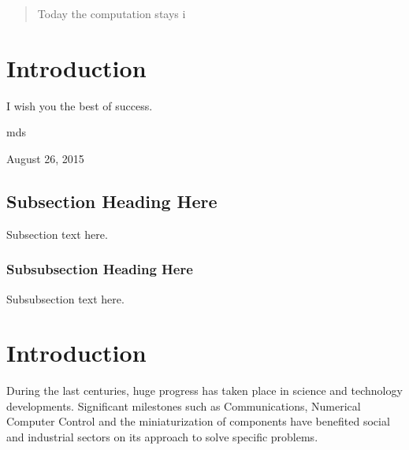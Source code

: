 \documentclass[conference]{IEEEtran}
\begin{document}




\maketitle

\begin{abstract}
Today the computation stays i 
\end{abstract}





%
\IEEEpeerreviewmaketitle



\section{Introduction}

I wish you the best of success.

\hfill mds
 
\hfill August 26, 2015

\subsection{Subsection Heading Here}
Subsection text here.


\subsubsection{Subsubsection Heading Here}
Subsubsection text here.

\section{Introduction}
During the last centuries, huge progress has taken place in science and technology developments. Significant milestones such as Communications, Numerical Computer Control and the miniaturization of components have benefited social and industrial sectors on its approach to solve specific problems. 
\\
\end{document}
